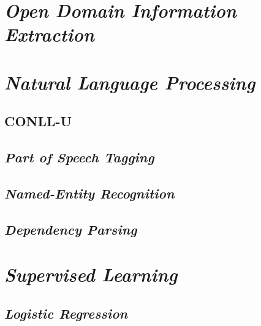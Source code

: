 \section{\textit{Open Domain Information Extraction}}

\lipsum[2-3]

\section{\textit{Natural Language Processing}}

\lipsum[3]

\subsection{CONLL-U}

\lipsum[4]

\subsection{\textit{Part of Speech Tagging}}

\lipsum[4]

\subsection{\textit{Named-Entity Recognition}}

\lipsum[5]

\subsection{\textit{Dependency Parsing}}

\lipsum[6]

\section{\textit{Supervised Learning}}

\lipsum[3]

\subsection{\textit{Logistic Regression}}

